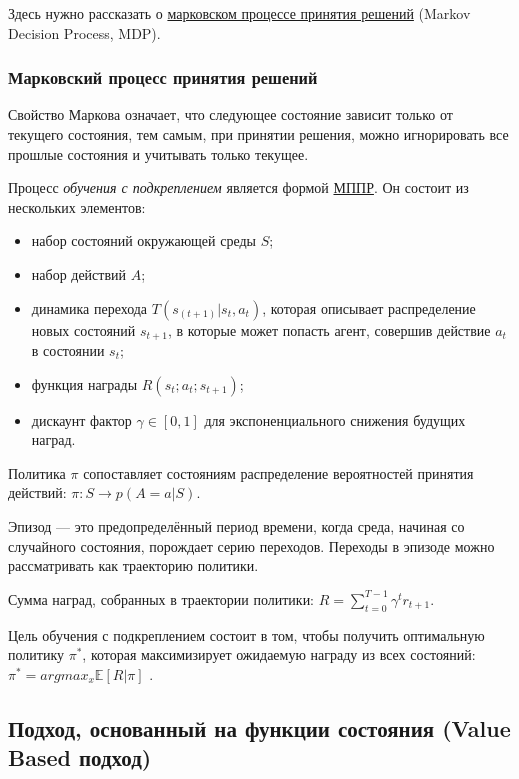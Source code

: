 Здесь нужно рассказать о \hyperref[acr:mdp]{марковском процессе принятия решений} (Markov Decision Process, MDP).

\subsubsection{Марковский процесс принятия решений}

Свойство Маркова означает, что следующее состояние зависит только от текущего состояния, тем самым, при принятии решения, можно игнорировать все прошлые состояния и учитывать только текущее.

Процесс {\itshape обучения с подкреплением} является формой \hyperref[acr:mdp]{МППР}. Он состоит из нескольких элементов:

\begin{itemize}
    \item набор состояний окружающей среды $S$;
    \item набор действий $A$;
    \item динамика перехода $T(s_{(t+1)}|s_t, a_t)$, которая описывает распределение новых состояний $s_{t+1}$, в которые может попасть агент, совершив действие $a_t$ в состоянии $s_t$;
    \item функция награды $R(s_t; a_t; s_{t+1})$;
    \item дискаунт фактор $\gamma \in [0, 1]$ для экспоненциального снижения будущих наград.
\end{itemize}

Политика $\pi$ сопоставляет состояниям распределение вероятностей принятия действий: ${\pi : S \to p(A = a|S)}$.

Эпизод --- это предопределённый период времени, когда среда, начиная со случайного состояния, порождает серию переходов. Переходы в эпизоде можно рассматривать как траекторию политики.

Сумма наград, собранных в траектории политики: ${R = \sum_{t=0}^{T-1} \gamma^t r_{t+1}}$.

Цель обучения с подкреплением состоит в том, чтобы получить оптимальную политику ${\pi^*}$, которая максимизирует ожидаемую награду из всех состояний: ${\pi^* = argmax_x \mathbb{E} [R|\pi]}$ \cite{Otterlo2012ReinforcementLA}.

\subsection{Подход, основанный на функции состояния (Value Based подход)}

